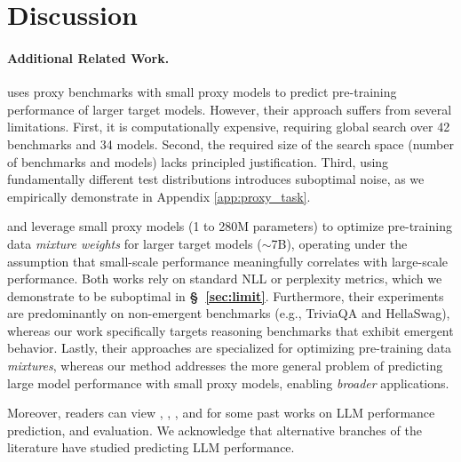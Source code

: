 \section{Discussion}\label{sec:discussion}

\paragraph{Additional Related Work.} \cite{zhang2024predictable} uses proxy benchmarks with small proxy models to predict pre-training performance of larger target models. However, their approach suffers from several limitations. First, it is computationally expensive, requiring global search over 42 benchmarks and 34 models. Second, the required size of the search space (number of benchmarks and models) lacks principled justification. Third, using fundamentally different test distributions introduces suboptimal noise, as we empirically demonstrate in Appendix \ref{app:proxy_task}. 

\cite{xie2023doremi} and \cite{liu2025regmix} leverage small proxy models (1 to 280M parameters) to optimize pre-training data \textit{mixture weights} for larger target models ($\sim$7B), operating under the assumption that small-scale performance meaningfully correlates with large-scale performance. Both works rely on standard NLL or perplexity metrics, which we demonstrate to be suboptimal in \textbf{\S\ \ref{sec:limit}}. Furthermore, their experiments are predominantly on non-emergent benchmarks (e.g., TriviaQA and HellaSwag), whereas our work specifically targets reasoning benchmarks that exhibit emergent behavior. Lastly, their approaches are specialized for optimizing pre-training data \textit{mixtures}, whereas our method addresses the more general problem of predicting large model performance with small proxy models, enabling \textit{broader} applications.

Moreover, readers can view \cite{10651521}, \cite{10.1145/3706118}, \cite{kipnis2025metabench}, and \cite{pacchiardi-etal-2025-predictaboard} for some past works on LLM performance prediction, and evaluation. We acknowledge that alternative branches of the literature have studied predicting LLM performance.

